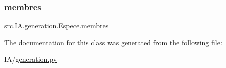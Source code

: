 \subsubsection{\texorpdfstring{membres}{membres}}
{\footnotesize\ttfamily src.\+I\+A.\+generation.\+Espece.\+membres}



The documentation for this class was generated from the following file\+:\begin{DoxyCompactItemize}
\item 
I\+A/\hyperlink{generation_8py}{generation.\+py}\end{DoxyCompactItemize}
